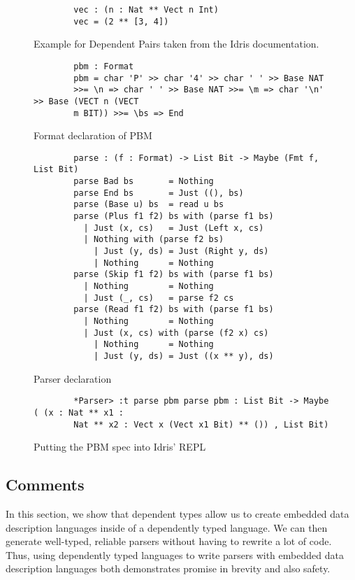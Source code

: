 \begin{figure}[h]
    \caption{Example for Dependent Pairs taken from the Idris documentation.}
    \label{dependentPairExample}
    \begin{lstlisting}
        vec : (n : Nat ** Vect n Int)
        vec = (2 ** [3, 4])
    \end{lstlisting}
\end{figure}

\begin{figure}[h]
    \caption{Format declaration of PBM \protect\cite{power_of_pi}}
    \label{spec_declaration}
    \begin{lstlisting}
        pbm : Format 
        pbm = char 'P' >> char '4' >> char ' ' >> Base NAT
        >>= \n => char ' ' >> Base NAT >>= \m => char '\n' >> Base (VECT n (VECT
        m BIT)) >>= \bs => End
    \end{lstlisting}
\end{figure}


\begin{figure}[ht!!!!!]
    \caption{Parser declaration \protect\cite{power_of_pi}}
    \label{parser}
    \begin{lstlisting}
        parse : (f : Format) -> List Bit -> Maybe (Fmt f, List Bit)
        parse Bad bs       = Nothing
        parse End bs       = Just ((), bs)
        parse (Base u) bs  = read u bs
        parse (Plus f1 f2) bs with (parse f1 bs)
          | Just (x, cs)   = Just (Left x, cs)
          | Nothing with (parse f2 bs)
            | Just (y, ds) = Just (Right y, ds)
            | Nothing      = Nothing
        parse (Skip f1 f2) bs with (parse f1 bs)
          | Nothing        = Nothing
          | Just (_, cs)   = parse f2 cs
        parse (Read f1 f2) bs with (parse f1 bs)
          | Nothing        = Nothing
          | Just (x, cs) with (parse (f2 x) cs)
            | Nothing      = Nothing
            | Just (y, ds) = Just ((x ** y), ds)
    \end{lstlisting}
\end{figure}

\begin{figure}[ht]
    \caption{Putting the PBM spec into Idris' REPL}
    \label{repl}
    \begin{lstlisting}
        *Parser> :t parse pbm parse pbm : List Bit -> Maybe ( (x : Nat ** x1 :
        Nat ** x2 : Vect x (Vect x1 Bit) ** ()) , List Bit)
    \end{lstlisting}
\end{figure}

\subsection{Comments}

In this section, we show that dependent types allow us to create embedded data
description languages inside of a dependently typed language. We can then
generate well-typed, reliable parsers without having to rewrite a lot of code.
Thus, using dependently typed languages to write parsers with embedded data
description languages both demonstrates promise in brevity and also safety. 